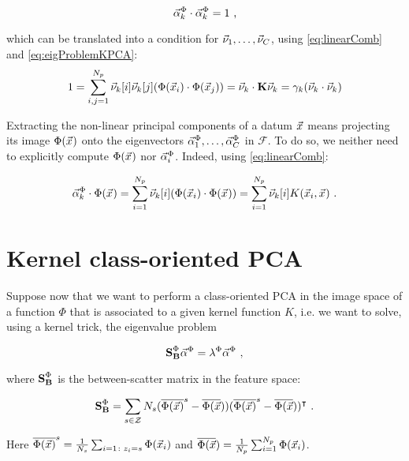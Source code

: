 \begin{equation}
\vec{\alpha}^\Phi_k\cdot\vec{\alpha}^\Phi_k = 1 \mbox{ ,}
\end{equation}

which can be translated into a condition for $\vec{\nu}_1,\dots, \vec{\nu}_C$, using \eqref{eq:linearComb} and \eqref{eq:eigProblemKPCA}:
\begin{equation}
1 = \sum_{i,j=1}^{N_p}\vec{\nu}_k[i]\vec{\nu}_k[j](\Phi(\vec{x}_{i})\cdot \Phi(\vec{x}_{j})) = \vec{\nu}_k \cdot \textbf{K}\vec{\nu}_k = \gamma_k(\vec{\nu}_k\cdot \vec{\nu}_k)
\end{equation}


Extracting the non-linear principal components of a datum $\vec{x}_{}$ means projecting its image $\Phi(\vec{x}_{})$ onto the eigenvectors $\vec{\alpha}^\Phi_1,\dots, \vec{\alpha}^\Phi_C$ in $\mathcal{F}$. To do so, we neither need to explicitly compute $\Phi(\vec{x}_{})$ nor $\vec{\alpha}^\Phi_i$. Indeed, using \eqref{eq:linearComb}:

\begin{equation}
\vec{\alpha}^\Phi_k \cdot \Phi(\vec{x}_{}) = \sum_{i=1}^{N_p}\vec{\nu}_k[i](\Phi(\vec{x}_{i}) \cdot \Phi(\vec{x}_{})) =  \sum_{i=1}^{N_p}\vec{\nu}_k[i]K(\vec{x}_{i}, \vec{x}_{}) \mbox{ .}
\end{equation}



\section{Kernel class-oriented PCA}

Suppose now that we want to perform a class-oriented PCA in the image space of a function $\Phi$ that is associated to a given kernel function $K$, i.e. we want to solve, using a kernel trick, the eigenvalue problem


\begin{equation}\label{eq:eigProblemSB}
\textbf{S}_{\textbf{B}}^\Phi\vec{\alpha}^\Phi = \lambda^\Phi \vec{\alpha}^\Phi \mbox{ ,}
\end{equation}

where $\textbf{S}_{\textbf{B}}^\Phi$ is the between-scatter matrix in the feature space: 

\begin{equation}
\textbf{S}_{\textbf{B}}^\Phi = \sum_{s\in\mathcal{Z}}N_{s}(\overline{\Phi(\vec{x})}^{s}-\overline{\Phi(\vec{x}}))(\overline{\Phi(\vec{x})}^{s}-\overline{\Phi(\vec{x}}))^\intercal \mbox{ .}
\end{equation}

Here $\overline{\Phi(\vec{x})}^{s} = \frac{1}{N_{s}}\sum_{i=1\colon z_i=s}\Phi(\vec{x}_{i})$ and $\overline{\Phi(\vec{x}}) = \frac{1}{N_p}\sum_{i=1}^{N_p}\Phi(\vec{x}_{i})$.\\

